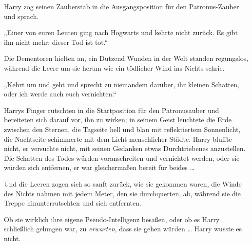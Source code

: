 Harry zog seinen Zauberstab in die Ausgangsposition für den Patronus-Zauber und sprach.

„Einer von euren Leuten ging nach Hogwarts und kehrte nicht zurück. Es gibt ihn nicht mehr; dieser Tod ist tot.“

Die Dementoren hielten an, ein Dutzend Wunden in der Welt standen regungslos, während die Leere um sie herum wie ein tödlicher Wind ins Nichts schrie.

„Kehrt um und geht und sprecht zu niemandem darüber, ihr kleinen Schatten, oder ich werde auch euch vernichten.“

Harrys Finger rutschten in die Startposition für den Patronusauber und bereiteten sich darauf vor, ihn zu wirken; in seinem Geist leuchtete die Erde zwischen den Sternen, die Tagseite hell und blau mit reflektiertem Sonnenlicht, die Nachtseite schimmerte mit dem Licht menschlicher Städte. Harry bluffte nicht, er versuchte nicht, mit seinen Gedanken etwas Durchtriebenes anzustellen. Die Schatten des Todes würden voranschreiten und vernichtet werden, oder sie würden sich entfernen, er war gleichermaßen bereit für beides …

Und die Leeren zogen sich so sanft zurück, wie sie gekommen waren, die Winde des Nichts nahmen mit jedem Meter, den sie durchquerten, ab, während sie die Treppe hinunterrutschten und sich entfernten.

Ob sie wirklich ihre eigene Pseudo-Intelligenz besaßen, oder ob es Harry schließlich gelungen war, zu \emph{erwarten}, dass sie gehen würden … Harry wusste es nicht.

